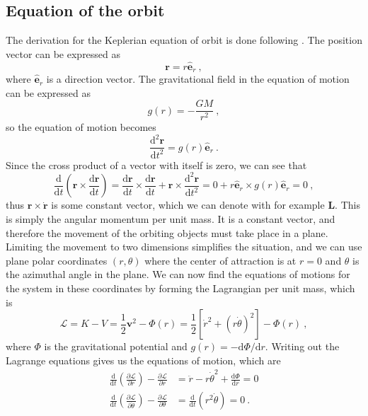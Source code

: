 \documentclass[english, oneside]{HYgradu}
\begin{document}
\subsection{Equation of the orbit}

The derivation for the Keplerian equation of orbit is done following \cite{bt-galdyn}. The position vector can be expressed as
\begin{equation}
\mathbf{r} = r \hat{\mathbf{e}}_r \ ,
\end{equation}
where $\hat{\mathbf{e}}_r$ is a direction vector. The gravitational field in the equation of motion can be expressed as
\begin{equation}
g(r) = -\frac{G M}{r^2} \ ,
\end{equation}
so the equation of motion becomes
\begin{equation}
\frac{\mathrm{d}^2 \mathbf{r}}{\mathrm{d} t^2} = g(r) \hat{\mathbf{e}}_r \ .
\end{equation}
Since the cross product of a vector with itself is zero, we can see that
\begin{equation}
\frac{\mathrm{d}}{\mathrm{d} t} \left( \mathbf{r} \times \frac{\mathrm{d} \mathbf{r}}{\mathrm{d} t} \right) = \frac{\mathrm{d} \mathbf{r}}{\mathrm{d} t} \times \frac{\mathrm{d} \mathbf{r}}{\mathrm{d} t} + \mathbf{r} \times \frac{\mathrm{d}^2 \mathbf{r}}{\mathrm{d} t^2} = 0 + r \hat{\mathbf{e}}_r \times g(r) \hat{\mathbf{e}}_r = 0 \ ,
\end{equation}
thus $\mathbf{r} \times \mathbf{\dot{r}}$ is some constant vector, which we can denote with for example $\mathbf{L}$. This is simply the angular momentum per unit mass. It is a constant vector, and therefore the movement of the orbiting objects must take place in a plane. Limiting the movement to two dimensions simplifies the situation, and we can use plane polar coordinates $(r, \theta)$ where the center of attraction is at $r = 0$ and $\theta$ is the azimuthal angle in the plane. We can now find the equations of motions for the system in these coordinates by forming the Lagrangian per unit mass, which is
\begin{equation}
\mathcal{L} = K - V = \frac{1}{2} \mathbf{v}^2 - \Phi (r) = \frac{1}{2} \left[ \dot{r}^2 + (r \dot{\theta})^2 \right] - \Phi (r) \ ,
\end{equation}
where $\Phi$ is the gravitational potential and $g(r) = -\mathrm{d} \Phi / \mathrm{d} r$. Writing out the Lagrange equations gives us the equations of motion, which are
\begin{align}
\frac{\mathrm{d} }{\mathrm{d} t} \left( \frac{\partial \mathcal{L}}{\partial \dot{r}} \right) - \frac{\partial \mathcal{L}}{\partial r} &= \ddot{r} - r \dot{\theta}^2 + \frac{\mathrm{d} \Phi}{\mathrm{d} r} = 0 \label{equ:leom1} \\
\frac{\mathrm{d} }{\mathrm{d} t} \left( \frac{\partial \mathcal{L}}{\partial \dot{\theta}} \right) - \frac{\partial \mathcal{L}}{\partial \theta} &= \frac{\mathrm{d}}{\mathrm{d} t} (r^2 \dot{\theta}) = 0 \label{equ:leom2} \ .
\end{align}
\end{document}
